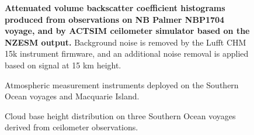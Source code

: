 \begin{figure}
\centering
\caption{
\textbf{Attenuated volume backscatter coefficient histograms produced from
observations on NB Palmer NBP1704 voyage, and by ACTSIM ceilometer simulator
based on the NZESM output.} Background noise is removed by the Lufft CHM 15k
instrument firmware,
and an additional noise removal is applied based on signal at 15 km height.
}
\label{fig:results}
\end{figure}


\begin{figure}[h]
\centering
\caption{
Atmospheric measurement instruments deployed on the Southern Ocean voyages and Macquarie Island.
}
\end{figure}

\begin{figure}[h]
\centering
\caption{
Cloud base height distribution on three Southern Ocean voyages derived from
ceilometer observations.
}
\end{figure}
